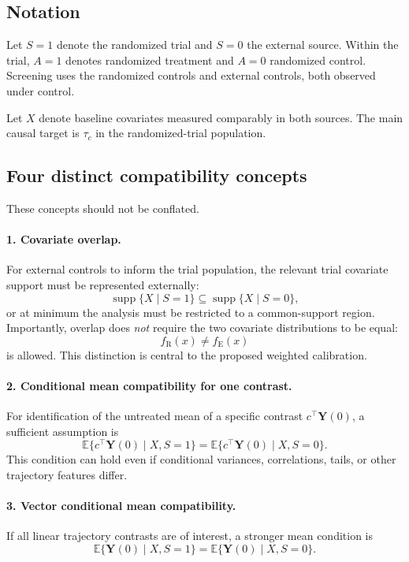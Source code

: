 \documentclass[11pt]{article}
\newcommand{\R}{\mathrm{R}}
\newcommand{\E}{\mathrm{E}}
\newcommand{\Exp}{\mathbb{E}}
\newcommand{\supp}{\operatorname{supp}}
\begin{document}
\subsection{Notation}

Let $S=1$ denote the randomized trial and $S=0$ the external source. Within the trial, $A=1$ denotes randomized treatment and $A=0$ randomized control. Screening uses the randomized controls and external controls, both observed under control.

Let $X$ denote baseline covariates measured comparably in both sources. The main causal target is $\tau_c$ in the randomized-trial population.

\subsection{Four distinct compatibility concepts}

These concepts should not be conflated.

\paragraph{1. Covariate overlap.}
For external controls to inform the trial population, the relevant trial covariate support must be represented externally:
\[
\supp\{X\mid S=1\}\subseteq \supp\{X\mid S=0\},
\]
or at minimum the analysis must be restricted to a common-support region. Importantly, overlap does \emph{not} require the two covariate distributions to be equal:
\[
f_{\R}(x)\neq f_{\E}(x)
\]
is allowed. This distinction is central to the proposed weighted calibration.

\paragraph{2. Conditional mean compatibility for one contrast.}
For identification of the untreated mean of a specific contrast $c^{\top}\bm Y(0)$, a sufficient assumption is
\[
\Exp\{c^{\top}\bm Y(0)\mid X,S=1\}
=
\Exp\{c^{\top}\bm Y(0)\mid X,S=0\}.
\tag{ME-$c$}
\]
This condition can hold even if conditional variances, correlations, tails, or other trajectory features differ.

\paragraph{3. Vector conditional mean compatibility.}
If all linear trajectory contrasts are of interest, a stronger mean condition is
\[
\Exp\{\bm Y(0)\mid X,S=1\}
=
\Exp\{\bm Y(0)\mid X,S=0\}.
\tag{VME}
\]
\end{document}
